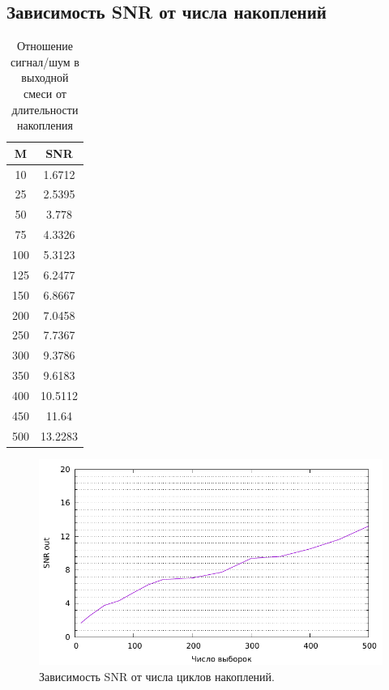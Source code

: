 \documentclass[12pt, a4paper] {ncc}
\begin{document}
    \subsection{Зависимость SNR от числа накоплений}
        \begin{table}[H]
            \centering
            \begin{tabular} { |c|c| }
                \hline
                \textbf{M} & \textbf{SNR} \\ \hline
                    10     &  1.6712    \\ \hline
                    25     &  2.5395    \\ \hline
                    50     &  3.778     \\ \hline
                    75     &  4.3326    \\ \hline
                    100    &  5.3123    \\ \hline
                    125    &  6.2477    \\ \hline
                    150    &  6.8667    \\ \hline
                    200    &  7.0458    \\ \hline
                    250    &  7.7367    \\ \hline
                    300    &  9.3786    \\ \hline
                    350    &  9.6183    \\ \hline
                    400    &  10.5112   \\ \hline
                    450    &  11.64     \\ \hline
                    500    &  13.2283   \\ \hline
            \end{tabular}
            \caption{Отношение сигнал/шум в выходной смеси от длительности накопления}
        \end{table}

        \begin{figure}[H]
            \centering
            \includegraphics[scale=0.9,page=1]{stat_by_m.pdf}
            \caption{Зависимость SNR от числа циклов накоплений.}
        \end{figure}
\end{document}
